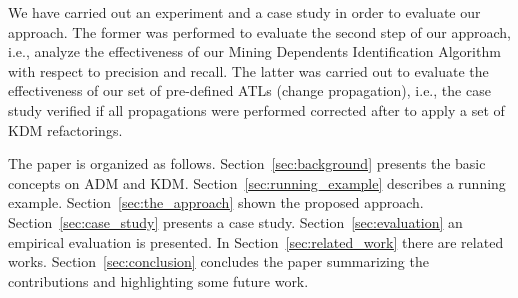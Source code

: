We have carried out an experiment and a case study in order to evaluate our approach. The former was performed to evaluate the second step of our approach, i.e., analyze the effectiveness of our Mining Dependents Identification Algorithm with respect to precision and recall. The latter was carried out to evaluate the effectiveness of our set of pre-defined ATLs (change propagation), i.e., the case study verified if all propagations were performed corrected after to apply a set of KDM refactorings.

The paper is organized as follows. Section~\ref{sec:background} presents the basic concepts on ADM and KDM. Section~\ref{sec:running_example} describes a running example. 
%
%
 Section~\ref{sec:the_approach} shown the proposed approach. Section~\ref{sec:case_study} presents a case study. Section~\ref{sec:evaluation} an empirical evaluation is presented. In Section~\ref{sec:related_work} there are related works. %
Section~\ref{sec:conclusion} concludes the paper summarizing the contributions and highlighting some future work.





